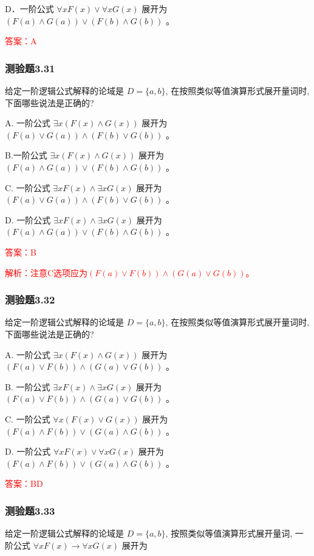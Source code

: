 \documentclass[UTF8, heading=true]{ctexart}
\begin{document}
D．一阶公式 $\forall x F(x) \vee \forall x G(x)$ 展开为 $(F(a) \wedge G(a)) \vee(F(b) \wedge G(b))$ 。

\textcolor{red}{答案：A}

\subsubsection{测验题3.31}

给定一阶逻辑公式解释的论域是 $D=\{a, b\}$, 在按照类似等值演算形式展开量词时, 下面哪些说法是正确的?

A. 一阶公式 $\exists x(F(x) \wedge G(x))$ 展开为 $(F(a) \vee G(a)) \wedge(F(b) \vee G(b))$ 。

B.一阶公式 $\exists x(F(x) \wedge G(x))$ 展开为 $(F(a) \wedge G(a)) \vee(F(b) \wedge G(b))$ 。

C. 一阶公式 $\exists x F(x) \wedge \exists x G(x)$ 展开为 $(F(a) \vee G(a)) \wedge(F(b) \vee G(b))$ 。

D. 一阶公式 $\exists x F(x) \wedge \exists x G(x)$ 展开为 $(F(a) \wedge G(a)) \vee(F(b) \wedge G(b))$ 。

\textcolor{red}{答案：B}

\textcolor{red}{解析：注意C选项应为$(F(a) \vee F(b)) \wedge(G(a) \vee G(b))$。}

\subsubsection{测验题3.32}

给定一阶逻辑公式解释的论域是 $D=\{a, b\}$, 在按照类似等值演算形式展开量词时, 下面哪些说法是正确的?

A. 一阶公式 $\exists x(F(x) \wedge G(x))$ 展开为 $(F(a) \vee F(b)) \wedge(G(a) \vee G(b))$ 。

B.  一阶公式 $\exists x F(x) \wedge \exists x G(x)$ 展开为 $(F(a) \vee F(b)) \wedge(G(a) \vee G(b))$ 。

C. 一阶公式 $\forall x(F(x) \vee G(x))$ 展开为 $(F(a) \wedge F(b)) \vee(G(a) \wedge G(b))$ 。

D. 一阶公式 $\forall x F(x) \vee \forall x G(x)$ 展开为 $(F(a) \wedge F(b)) \vee(G(a) \wedge G(b))$ 。

\textcolor{red}{答案：BD}

\subsubsection{测验题3.33}

给定一阶逻辑公式解释的论域是 $D=\{a, b\}$, 按照类似等值演算形式展开量词, 一阶公式 $\forall x F(x) \rightarrow \forall x G(x)$ 展开为 $\qquad$
\end{document}
